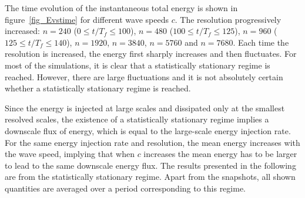 The time evolution of the instantaneous total energy is shown in
figure~\ref{fig_Evstime} for different wave speeds $c$.
%
The resolution  progressively
increased: %
$n = 240$ ($0\leqslant t/T_f \leqslant 100$), %
$n = 480$ ($100\leqslant t/T_f \leqslant 125$), %
$n = 960$ ($125\leqslant t/T_f \leqslant 140$), %
$n = 1920$, %
$n = 3840$, %
$n = 5760$ and %
$n = 7680$.
%
Each time the resolution is increased, the energy first sharply
increases and then fluctuates.  For most of the simulations, it is
clear that a statistically stationary regime is reached.
%
However, 
%
%
%
there are large fluctuations and it is not absolutely certain whether
a statistically stationary regime is reached.
%
%


Since the energy is injected at large scales and dissipated only at
the smallest resolved scales, the existence of a statistically
stationary regime implies a downscale flux of energy, which is equal
to the large-scale energy injection rate.
%
For the same energy injection rate and resolution, the mean energy
increases with the wave speed, implying that when $c$ increases the
mean energy has to be larger to lead to the same downscale energy
flux.
%
The results presented in the following are from the statistically
stationary regime.  Apart from the snapshots, all shown quantities are
averaged over a period corresponding to this regime.



